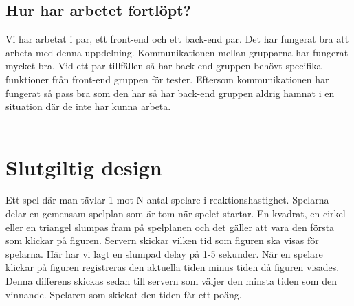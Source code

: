 \documentclass[a4paper]{article}
\begin{document}
\subsection{Hur har arbetet fortlöpt?}
Vi har arbetat i par, ett front-end och ett back-end par. Det har fungerat bra att arbeta med denna uppdelning. Kommunikationen mellan grupparna har fungerat mycket bra. Vid ett par tillfällen så har back-end gruppen behövt specifika funktioner från front-end gruppen för tester. Eftersom kommunikationen har fungerat så pass bra som den har så har back-end gruppen aldrig hamnat i en situation där de inte har kunna arbeta. \\
\\

\section{Slutgiltig design}
Ett spel där man tävlar 1 mot N antal spelare i reaktionshastighet. Spelarna delar en gemensam spelplan som är tom när spelet startar. En kvadrat, en cirkel eller en triangel slumpas fram på spelplanen och det gäller att vara den första som klickar på figuren. Servern skickar vilken tid som figuren ska visas för spelarna. Här har vi lagt en slumpad delay på  1-5 sekunder. När en spelare klickar på figuren registreras den aktuella tiden minus tiden då figuren visades. Denna differens skickas sedan till servern som väljer den minsta tiden som den vinnande. Spelaren som skickat den tiden får ett poäng.
\end{document}
